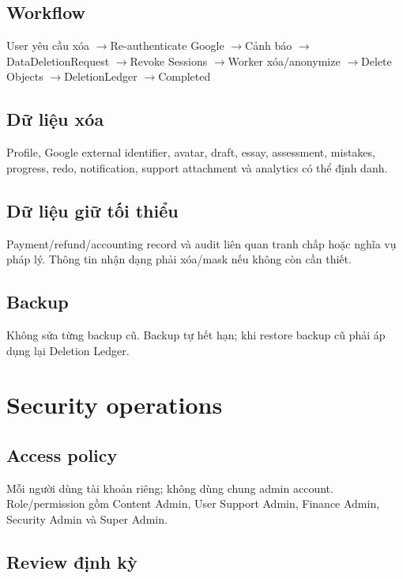 \documentclass[11pt,a4paper]{article}
\newcommand{\arrow}{\ensuremath{\rightarrow}}
\begin{document}
\subsection{Workflow}

\begin{flowbox}
User yêu cầu xóa \arrow Re-authenticate Google \arrow Cảnh báo \arrow DataDeletionRequest \arrow Revoke Sessions \arrow Worker xóa/anonymize \arrow Delete Objects \arrow DeletionLedger \arrow Completed
\end{flowbox}

\subsection{Dữ liệu xóa}

Profile, Google external identifier, avatar, draft, essay, assessment, mistakes, progress, redo, notification, support attachment và analytics có thể định danh.

\subsection{Dữ liệu giữ tối thiểu}

Payment/refund/accounting record và audit liên quan tranh chấp hoặc nghĩa vụ pháp lý. Thông tin nhận dạng phải xóa/mask nếu không còn cần thiết.

\subsection{Backup}

Không sửa từng backup cũ. Backup tự hết hạn; khi restore backup cũ phải áp dụng lại Deletion Ledger.

\section{Security operations}

\subsection{Access policy}

Mỗi người dùng tài khoản riêng; không dùng chung admin account. Role/permission gồm Content Admin, User Support Admin, Finance Admin, Security Admin và Super Admin.

\subsection{Review định kỳ}
\end{document}
